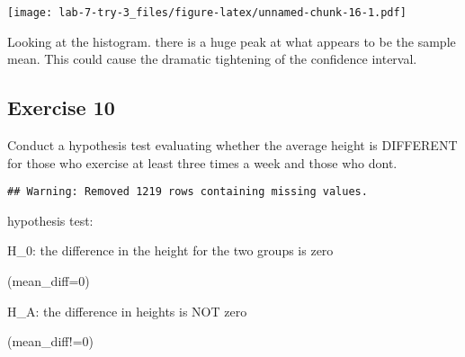 \documentclass[
]{article}
\newenvironment{Shaded}{\begin{snugshade}}{\end{snugshade}}
\newcommand{\CommentTok}[1]{\textcolor[rgb]{0.56,0.35,0.01}{\textit{#1}}}
\newcommand{\DataTypeTok}[1]{\textcolor[rgb]{0.13,0.29,0.53}{#1}}
\newcommand{\DecValTok}[1]{\textcolor[rgb]{0.00,0.00,0.81}{#1}}
\newcommand{\KeywordTok}[1]{\textcolor[rgb]{0.13,0.29,0.53}{\textbf{#1}}}
\newcommand{\NormalTok}[1]{#1}
\newcommand{\OperatorTok}[1]{\textcolor[rgb]{0.81,0.36,0.00}{\textbf{#1}}}
\newcommand{\StringTok}[1]{\textcolor[rgb]{0.31,0.60,0.02}{#1}}
\begin{document}
\texttt{[image: lab-7-try-3\_files/figure-latex/unnamed-chunk-16-1.pdf]}

Looking at the histogram. there is a huge peak at what appears to be the
sample mean. This could cause the dramatic tightening of the confidence
interval.

\hypertarget{exercise-10}{%
\subsection{Exercise 10}\label{exercise-10}}

Conduct a hypothesis test evaluating whether the average height is
DIFFERENT for those who exercise at least three times a week and those
who dont.

\begin{Shaded}
\end{Shaded}

\begin{verbatim}
## Warning: Removed 1219 rows containing missing values.
\end{verbatim}

hypothesis test:

H\_0: the difference in the height for the two groups is zero

(mean\_diff=0)

H\_A: the difference in heights is NOT zero

(mean\_diff!=0)

\begin{Shaded}
\end{Shaded}
\end{document}
